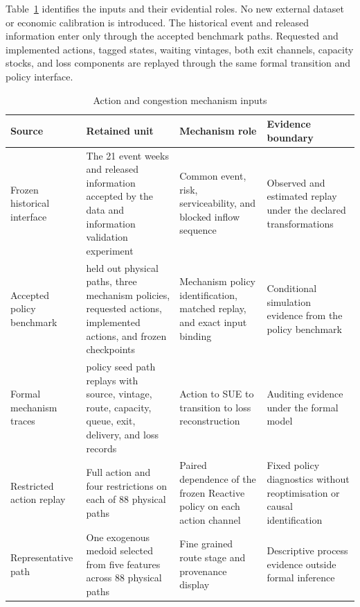 \documentclass[a4paper,fleqn]{cas-sc}
\begin{document}
Table~\ref{tab:523-mechanism-inputs} identifies the inputs and their evidential
roles. No new external dataset or economic calibration is introduced. The
historical event and released information enter only through the accepted
benchmark paths. Requested and implemented actions, tagged states, waiting
vintages, both exit channels, capacity stocks, and loss components are replayed
through the same formal transition and policy interface.

\begingroup
\setlength{\tabcolsep}{4pt}
\begin{table}[t]
\centering
\caption{Action and congestion mechanism inputs}
\label{tab:523-mechanism-inputs}
\begin{tabular}{>{\RaggedRight\arraybackslash}p{}
                >{\RaggedRight\arraybackslash}p{}
                >{\RaggedRight\arraybackslash}p{}
                >{\RaggedRight\arraybackslash}p{}}
\toprule
Source & Retained unit & Mechanism role & Evidence boundary \\
\midrule
Frozen historical interface
& The 21 event weeks and released information accepted by the data and information validation experiment
& Common event, risk, serviceability, and blocked inflow sequence
& Observed and estimated replay under the declared transformations \\
Accepted policy benchmark
& 88 held out physical paths, three mechanism policies, requested actions, implemented actions, and frozen checkpoints
& Mechanism policy identification, matched replay, and exact input binding
& Conditional simulation evidence from the policy benchmark \\
Formal mechanism traces
& 440 policy seed path replays with source, vintage, route, capacity, queue, exit, delivery, and loss records
& Action to SUE to transition to loss reconstruction
& Auditing evidence under the formal model \\
Restricted action replay
& Full action and four restrictions on each of 88 physical paths
& Paired dependence of the frozen Reactive policy on each action channel
& Fixed policy diagnostics without reoptimisation or causal identification \\
Representative path
& One exogenous medoid selected from five features across 88 physical paths
& Fine grained route stage and provenance display
& Descriptive process evidence outside formal inference \\
\bottomrule
\end{tabular}
\end{table}
\endgroup
\end{document}
